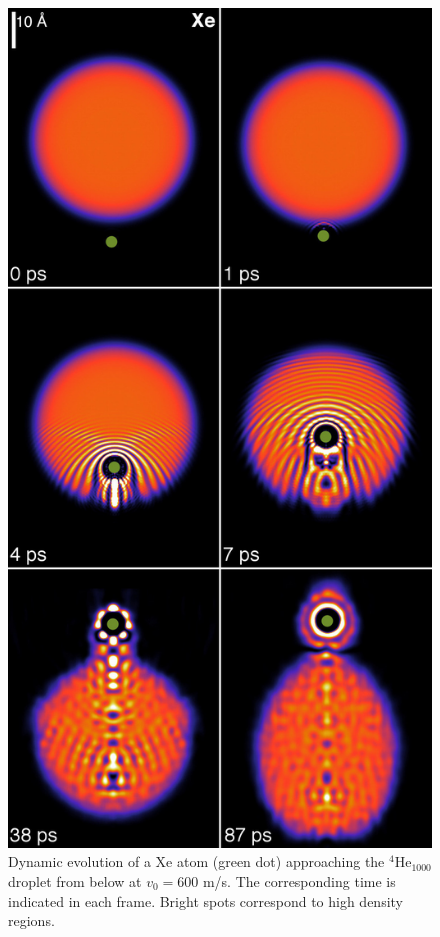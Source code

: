 \begin{figure}[!]
\centerline{\includegraphics[width=0.6\linewidth,clip]{fig1-Xe-600mps}}
\caption{\label{fig1} 
Dynamic evolution of a Xe atom (green dot) approaching the $^4$He$_{1000}$ 
droplet from below at $v_0 = 600$ m/s. The corresponding time is indicated in each frame. 
Bright spots correspond to high density regions.\cite{ESI} 
}
\end{figure}
%

